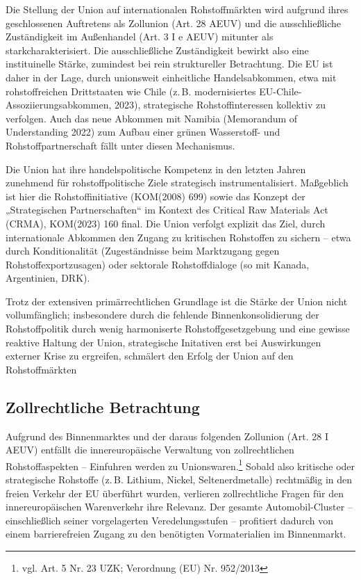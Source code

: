 \documentclass[12pt,a4paper,oneside]{book} %
\begin{document}
Die Stellung der Union auf internationalen Rohstoffmärkten wird aufgrund ihres geschlossenen Auftretens als Zollunion (Art. 28 AEUV) und die ausschließliche Zuständigkeit im Außenhandel (Art. 3 I e AEUV) mitunter als \glqq stark\grqq charakterisiert.\autocite{Schorkopf, Rohstoffverwaltung, Rn. 34.} Die ausschließliche Zuständigkeit bewirkt also eine instituinelle Stärke, zumindest bei rein struktureller Betrachtung. Die EU ist daher in der Lage, durch unionsweit einheitliche Handelsabkommen, etwa mit rohstoffreichen Drittstaaten wie Chile (z. B. modernisiertes EU-Chile-Assoziierungsabkommen, 2023), strategische Rohstoffinteressen kollektiv zu verfolgen. Auch das neue Abkommen mit Namibia (Memorandum of Understanding 2022) zum Aufbau einer grünen Wasserstoff- und Rohstoffpartnerschaft fällt unter diesen Mechanismus.

Die Union hat ihre handelspolitische Kompetenz in den letzten Jahren zunehmend für rohstoffpolitische Ziele strategisch instrumentalisiert. Maßgeblich ist hier die Rohstoffinitiative (KOM(2008) 699) sowie das Konzept der „Strategischen Partnerschaften“ im Kontext des Critical Raw Materials Act (CRMA), KOM(2023) 160 final. Die Union verfolgt explizit das Ziel, durch internationale Abkommen den Zugang zu kritischen Rohstoffen zu sichern -- etwa durch Konditionalität (Zugeständnisse beim Marktzugang gegen Rohstoffexportzusagen) oder sektorale Rohstoffdialoge (so mit Kanada, Argentinien, DRK).

Trotz der extensiven primärrechtlichen Grundlage ist die Stärke der Union nicht vollumfänglich; insbesondere durch die fehlende Binnenkonsolidierung der Rohstoffpolitik durch wenig harmoniserte Rohstoffgesetzgebung und eine gewisse reaktive Haltung der Union, strategische Initativen erst bei Auswirkungen externer Krise zu ergreifen, schmälert den Erfolg der Union auf den Rohstoffmärkten






\subsection{Zollrechtliche Betrachtung}
Aufgrund des Binnenmarktes und der daraus folgenden Zollunion (Art. 28 I AEUV) entfällt die innereuropäische Verwaltung von zollrechtlichen Rohstoffaspekten -- Einfuhren werden zu \glqq Unionswaren\grqq.\footnote{vgl. Art. 5 Nr. 23 UZK; Verordnung (EU) Nr. 952/2013} Sobald also kritische oder strategische Rohstoffe (z. B. Lithium, Nickel, Seltenerdmetalle) rechtmäßig in den freien Verkehr der EU überführt wurden, verlieren zollrechtliche Fragen für den innereuropäischen Warenverkehr ihre Relevanz. Der gesamte Automobil-Cluster – einschließlich seiner vorgelagerten Veredelungsstufen – profitiert dadurch von einem barrierefreien Zugang zu den benötigten Vormaterialien im Binnenmarkt.
\end{document}
